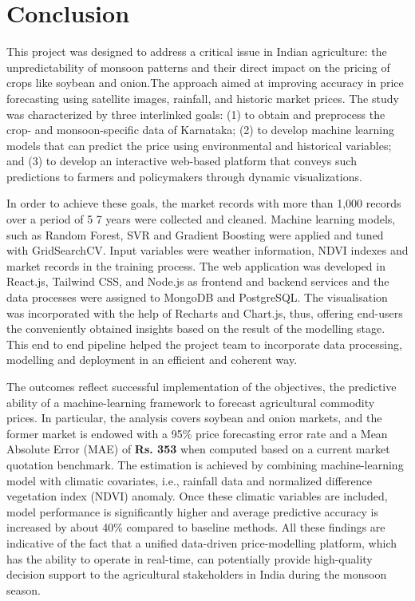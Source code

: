
\chapter{Conclusion}

This project was designed to address a critical issue in Indian agriculture: the unpredictability of monsoon patterns and their direct impact on the pricing of crops like soybean and onion.The approach aimed at improving accuracy in price forecasting using satellite images, rainfall, and historic market prices. The study was characterized by three interlinked goals: (1) to obtain and preprocess the crop- and monsoon-specific data of Karnataka; (2) to develop machine learning models that can predict the price using environmental and historical variables; and (3) to develop an interactive web-based platform that conveys such predictions to farmers and policymakers through dynamic visualizations.

In order to achieve these goals, the market records with more than 1,000 records over a period of 5 7 years were collected and cleaned. Machine learning models, such as Random Forest, SVR and Gradient Boosting were applied and tuned with GridSearchCV. Input variables were weather information, NDVI indexes and market records in the training process. The web application was developed in React.js, Tailwind CSS, and Node.js as frontend and backend services and the data processes were assigned to MongoDB and PostgreSQL. The visualisation was incorporated with the help of Recharts and Chart.js, thus, offering end-users the conveniently obtained insights based on the result of the modelling stage. This end to end pipeline helped the project team to incorporate data processing, modelling and deployment in an efficient and coherent way.

The outcomes reflect successful implementation of the objectives, the predictive ability of a machine-learning framework to forecast agricultural commodity prices. In particular, the analysis covers soybean and onion markets, and the former market is endowed with a 95\% price forecasting error rate and a Mean Absolute Error (MAE) of \textbf{Rs. 353} when computed based on a current market quotation benchmark. The estimation is achieved by combining machine-learning model with climatic covariates, i.e., rainfall data and normalized difference vegetation index (NDVI) anomaly. Once these climatic variables are included, model performance is significantly higher and average predictive accuracy is increased by about 40\% compared to baseline methods. All these findings are indicative of the fact that a unified data-driven price-modelling platform, which has the ability to operate in real-time, can potentially provide high-quality decision support to the agricultural stakeholders in India during the monsoon season.


